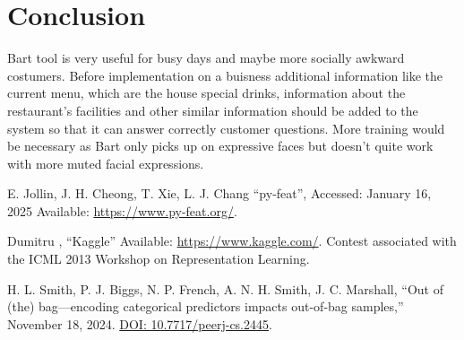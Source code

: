 \documentclass[conference]{IEEEtran}
\begin{document}
\section*{Conclusion}
Bart tool is very useful for busy days and maybe more socially awkward costumers. Before implementation on a buisness additional information like
the current menu, which are the house special drinks, information about the restaurant's facilities and other similar information should be added
to the system so that it can answer correctly customer questions. More training would be necessary as Bart only picks up on expressive faces
but doesn't quite work with more muted facial expressions. 

\begin{thebibliography}{00}

 E. Jollin, J. H. Cheong, T. Xie, L. J. Chang ``py-feat'', Accessed: January 16, 2025 Available:  \href{https://py-feat.org/pages/intro.html}{https://www.py-feat.org/}.

 Dumitru , ``Kaggle'' Available:  \href{https://www.kaggle.com/c/challenges-in-representation-learning-facial-expression-recognition-challenge/overview}{https://www.kaggle.com/}. Contest associated with the ICML 2013 Workshop on Representation Learning.

 H. L. Smith, P. J. Biggs, N. P. French, A. N. H. Smith, J. C. Marshall, ``Out of (the) bag—encoding categorical predictors impacts out-of-bag samples,'' November 18, 2024. \href{https://doi.org/10.7717/peerj-cs.2445}{DOI: 10.7717/peerj-cs.2445}.


\end{thebibliography}
\end{document}
